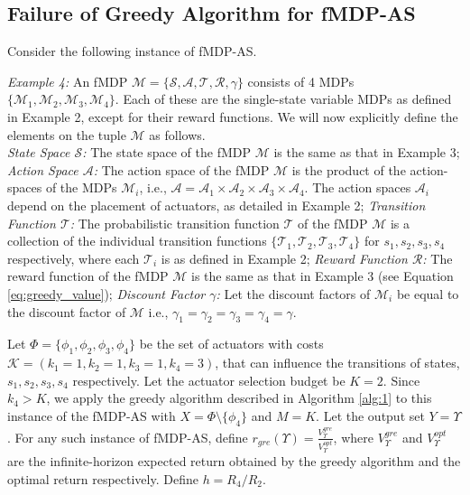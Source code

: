 \documentclass[twocolumn]{autart}    %
\begin{document}
\subsection{Failure of Greedy Algorithm for fMDP-AS}

Consider the following instance of fMDP-AS.

\textit{Example 4:} An fMDP $\mathcal{M}= \{ \mathcal{S}, \mathcal{A}, \mathcal{T}, \mathcal{R}, \gamma \}$ consists of 4 MDPs $\{\mathcal{M}_1, \mathcal{M}_2, \mathcal{M}_3, \mathcal{M}_4\}$. Each of these are the single-state variable MDPs as defined in Example 2, except for their reward functions. We will now explicitly define the elements on the tuple $\mathcal{M}$ as follows. \\
\textit{State Space $\mathcal{S}$:} The state space of the fMDP $\mathcal{M}$ is the 
same as that in Example 3; \textit{Action Space $\mathcal{A}$:} The action space of the fMDP $\mathcal{M}$ is the product of the action-spaces of the MDPs $\mathcal{M}_i$, i.e., $\mathcal{A} = \mathcal{A}_1 \times \mathcal{A}_2 \times \mathcal{A}_3 \times \mathcal{A}_4 $. The action spaces $\mathcal{A}_i$ depend on the placement of actuators, as detailed in Example 2; \textit{Transition Function $\mathcal{T}$:} The probabilistic transition function $\mathcal{T}$ of the fMDP $\mathcal{M}$ is a collection of the individual transition functions $\{ \mathcal{T}_1, \mathcal{T}_2, \mathcal{T}_3, \mathcal{T}_4  \}$ for $s_1,s_2,s_3,s_4$ respectively, where each $\mathcal{T}_i$ is as defined in Example 2; \textit{Reward Function $\mathcal{R}$:} The reward function of the fMDP $\mathcal{M}$ is the same as that in Example 3 (see Equation \ref{eq:greedy_value}); \textit{Discount Factor $\gamma$:} Let the discount factors of $\mathcal{M}_i$ be equal to the discount factor of $\mathcal{M}$ i.e., $\gamma_1 = \gamma_2 = \gamma_3 = \gamma_4 = \gamma$.

Let $\Phi = \{ \phi_1, \phi_2, \phi_3, \phi_4\}$ be the set of actuators with costs  $\mathcal{K} = (k_1 = 1, k_2 = 1, k_3 = 1, k_4 = 3)$, that can influence the transitions of states, $s_1, s_2,  s_3, s_4$ respectively. Let the actuator selection budget be $K=2$. Since $k_4 > K$, we apply the greedy algorithm described in Algorithm \ref{alg:1} to this instance of the fMDP-AS with $X = \Phi \setminus \{ \phi_4 \}$ and $M=K$. Let the output set $Y = \Upsilon $. For any such instance of fMDP-AS, define $r_{gre}(\Upsilon) =  \frac{V_{\Upsilon}^{gre}}{V_{\Upsilon}^{opt}}$,
where $V_{\Upsilon}^{gre}$ and $V_{\Upsilon}^{opt}$ are the infinite-horizon expected return obtained by the greedy algorithm and the optimal return respectively. Define $h = R_4/R_2$.\\
\end{document}
